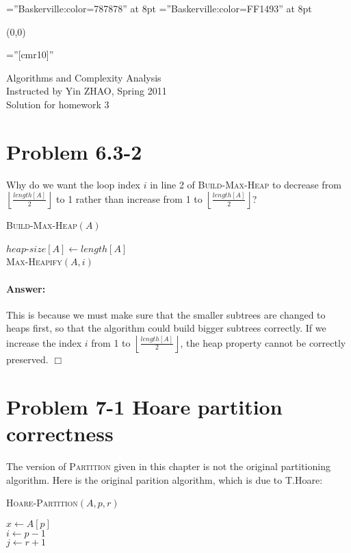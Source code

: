 \documentclass[a4paper,10pt]{article}
\newcommand{\problem}[1]{\section*{Problem #1}}
\newcommand{\answer}{\paragraph{Answer:}}
\newcommand{\qed}{\hfill \ensuremath{\Box}}
\begin{document}
\font\wm=''Baskerville:color=787878'' at 8pt
\font\wmtoday=''Baskerville:color=FF1493'' at 8pt
{\wm 
	\begin{textblock}{1}(0,0)
	\end{textblock}
}

\pagestyle{empty} %

\font\fb=''[cmr10]'' %

\par{\centering
  {\Large Algorithms and Complexity Analysis}
  \\
  { Instructed by Yin ZHAO, Spring 2011}
  \\
		{\Huge Solution for homework 3
	}\bigskip\par}


\problem{6.3-2}
Why do we want the loop index $i$ in line 2 of \textsc{Build-Max-Heap} to decrease from 
$\left\lfloor \frac{length[A]}{2}\right\rfloor$ to 1 rather than increase from 1
to $\left\lfloor \frac{length[A]}{2}\right\rfloor$?

\begin{algorithm}[H]
\caption{\textsc{Build-Max-Heap}$(A)$}
$heap$-$size[A]\leftarrow length[A]$\\
 {
  \textsc{Max-Heapify}$(A, i)$
}
\end{algorithm}

\answer

This is because we must make sure that the smaller subtrees are changed to heaps first, so that the
algorithm could build bigger subtrees correctly. If we increase the index $i$ from 1 to
$\left\lfloor\frac{length[A]}{2}\right\rfloor$, the heap property cannot be correctly preserved.
\qed

\problem{7-1 Hoare partition correctness}
The version of \textsc{Partition} given in this chapter is not the original partitioning algorithm. 
Here is the original parition algorithm, which is due to T.Hoare:

\begin{algorithm}[H]
\caption{\textsc{Hoare-Partition}$(A, p, r)$}
$x \leftarrow A[p]$\\
$i \leftarrow p - 1$\\
$j \leftarrow r + 1$\\
\end{algorithm}
\end{document}
